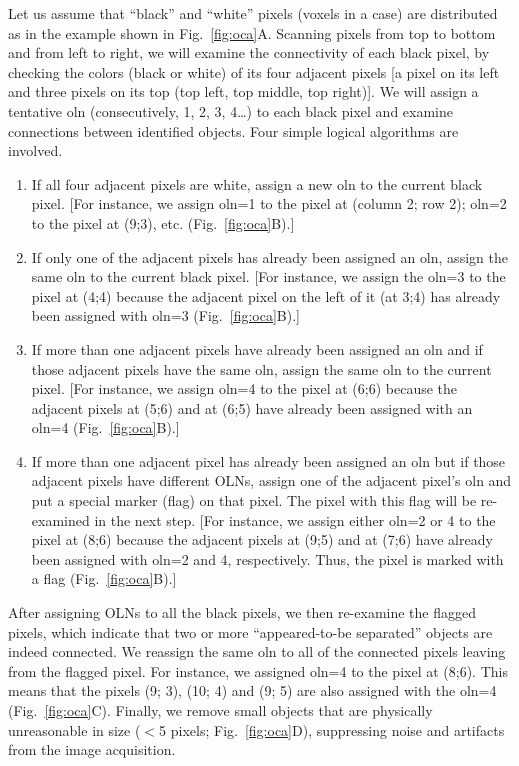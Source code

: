 Let us assume that ``black'' and ``white'' pixels (voxels in a \threed case) are distributed as in the example shown in Fig.~\ref{fig:oca}A. Scanning pixels from top to bottom and from left to right, we will examine the connectivity of each black pixel, by checking the colors (black or white) of its four adjacent pixels [a pixel on its left and three pixels on its top (top left, top middle, top right)]. We will assign a tentative \acf{oln} (consecutively, 1, 2, 3, 4\ldots) to each black pixel and examine connections between identified objects. Four simple logical algorithms are involved.
\begin{enumerate}
	\item If all four adjacent pixels are white, assign a new \ac{oln} to the current black pixel. [For instance, we assign \ac{oln}=1 to the pixel at (column 2; row 2); \ac{oln}=2 to the pixel at (9;3), etc. (Fig.~\ref{fig:oca}B).]
	\item If only one of the adjacent pixels has already been assigned an \ac{oln}, assign the same \ac{oln} to the current black pixel. [For instance, we assign the \ac{oln}=3 to the pixel at (4;4) because the adjacent pixel on the left of it (at 3;4) has already been assigned with \ac{oln}=3 (Fig.~\ref{fig:oca}B).]
	\item If more than one adjacent pixels have already been assigned an \ac{oln} and if those adjacent pixels have the same \ac{oln}, assign the same \ac{oln} to the current pixel. [For instance, we assign \ac{oln}=4 to the pixel at (6;6) because the adjacent pixels at (5;6) and at (6;5) have already been assigned with an \ac{oln}=4 (Fig.~\ref{fig:oca}B).]
	\item If more than one adjacent pixel has already been assigned an \ac{oln} but if those adjacent pixels have different OLNs, assign one of the adjacent pixel's \ac{oln} and put a special marker (flag) on that pixel. The pixel with this flag will be re-examined in the next step. [For instance, we assign either \ac{oln}=2 or 4 to the pixel at (8;6) because the adjacent pixels at (9;5) and at (7;6) have already been assigned with \ac{oln}=2 and 4, respectively. Thus, the pixel is marked with a flag (Fig.~\ref{fig:oca}B).]
\end{enumerate}
After assigning OLNs to all the black pixels, we then re-examine the flagged pixels, which indicate that two or more ``appeared-to-be separated'' objects are indeed connected. We reassign the same \ac{oln} to all of the connected pixels leaving from the flagged pixel. For instance, we assigned \ac{oln}=4 to the pixel at (8;6). This means that the pixels (9; 3), (10; 4) and (9; 5) are also assigned with the \ac{oln}=4 (Fig.~\ref{fig:oca}C). Finally, we remove small objects that are physically unreasonable in size ($<$5 pixels; Fig.~\ref{fig:oca}D), suppressing noise and artifacts from the image acquisition.

